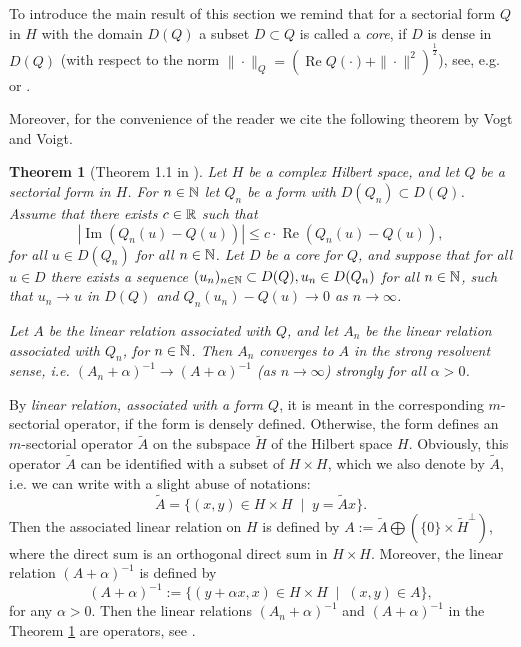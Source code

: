 \documentclass[a4paper,11pt]{amsart}
\newtheorem{theorem}{Theorem}[section]
\theoremstyle{definition}
\renewcommand{\Re}{\operatorname{Re}}%
\renewcommand{\Im}{\operatorname{Im}}%
\begin{document}
To introduce the main result of this section we remind that for a sectorial form $Q$ in $H$ with the domain $D(Q)$ a subset $D\subset Q$ is called a {\em core}, if $D$ is dense in $D(Q)$ (with respect to the norm $\|\cdot\|_Q=(\Re Q(\cdot)+\|\cdot\|^2)^\frac12$), see, e.g. \cite[Remark 3.4]{Arendt} or \cite[p. 317, Theorem 1.21]{Kato}.

Moreover, for the convenience of the reader we cite the following theorem by Vogt and Voigt.

\begin{theorem}[Theorem 1.1 in \cite{VogtVoigt}]\label{thm::VV}
Let $H$ be a complex Hilbert space, and let $Q$ be a sectorial form in $H$. For $n\in \Bbb N$ let $Q_n$ be a form with $D(Q_n)\subset D(Q)$. Assume that there exists $c\in\Bbb R$ such that 
\begin{equation*}
|\Im (Q_n(u)-Q(u))|\le c\cdot \Re (Q_n(u)-Q(u)),
\end{equation*}
for all $u\in D(Q_n)$ for all $n\in \Bbb N$.
Let $D$ be a core for $Q$, and suppose that for all $u\in D$ there exists a sequence $(u_n)_{n\in\Bbb N}\subset D(Q), u_n\in D(Q_n)$ for all $n\in \Bbb N$, such that $u_n\to u$ in $D(Q)$ and $Q_n(u_n)-Q(u)\to 0$ as $n\to \infty$.

Let $A$ be the linear relation associated with $Q$, and let $A_n$ be the linear relation associated with $Q_n$, for $n\in \Bbb N$. Then $A_n$ converges to $A$ in the strong resolvent sense, i.e. $(A_n+\alpha)^{-1}\to (A+\alpha)^{-1}$ (as $n\to\infty$) strongly for all $\alpha>0$.

\end{theorem}
By {\em linear relation, associated  with a form $Q$}, it is meant in \cite{VogtVoigt} the 
corresponding $m$-sectorial operator, if the form is densely defined. Otherwise, the form defines an $m$-sectorial operator $\widetilde A$ on the subspace $\widetilde H$ of the Hilbert space $H$. Obviously, this operator  $\widetilde A$ can be identified with a subset of $H\times H$, which we also denote by $\widetilde A$, i.e. we can write with a slight abuse of notations:
$$
\widetilde A=\{(x,y)\in H\times H\;\mid\;y = \widetilde Ax\}.
$$
Then  the associated linear relation on $H$ is defined by $A:=\widetilde A \bigoplus (\{0\} \times \widetilde H^\perp )$, where the direct sum is an orthogonal direct sum in $H\times H$. Moreover, the linear relation $(A+\alpha)^{-1}$ is defined by
$$
(A+\alpha)^{-1}:=\{(y+\alpha x,x)\in H\times H\;\mid\;(x,y)\in A\},
$$
for any $\alpha>0$.
Then the  linear relations $(A_n+\alpha)^{-1}$ and  $(A+\alpha)^{-1}$ in the Theorem \ref{thm::VV} are operators, see  \cite[Remark 3.2(d)]{VogtVoigt}.
\end{document}
